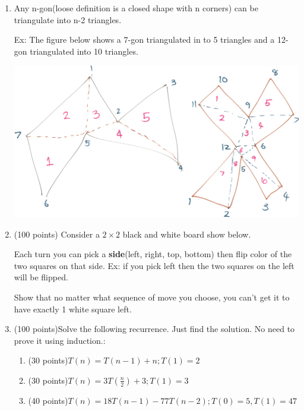 \documentclass[a4paper, 12pt, addpoints]{exam}
\newcommand{\manswer}{\vspace{2.5in}}
\begin{document}
\begin{enumerate}
	\newpage
	\item Any n-gon(loose definition is a closed shape with n corners) can be triangulate into n-2 triangles.
	
	Ex: The figure below shows a 7-gon triangulated in to 5 triangles and a 12-gon triangulated into 10 triangles.
	
	\begin{center}
		\includegraphics[width=0.7\linewidth]{n-gon}
	\end{center}
	
	
	
	

	
		
	\newpage
	\item (100 points)
	Consider a $2 \times 2$ black and white board show below.
	
	\begin{center}
	\end{center}
	
	Each turn you can pick a \textbf{side}(left, right, top, bottom) then flip color of the two squares on that side. Ex: if you pick left then the two squares on the left will be flipped.
	
	Show that no matter what sequence of move you choose, you can't get it to have exactly 1 white square left.
	
	\newpage
	\item (100 points)Solve the following recurrence. Just find the solution. No need to prove it using induction.:
	\begin{enumerate}
		\item (30 points)$T(n) = T(n-1) + n; T(1)=2$
		\vspace{4in}
		\item (30 points)$\displaystyle T(n)= 3T\left(\frac{n}{2}\right) + 3; T(1) = 3$
		\manswer
		\newpage
		\item (40 points)$T(n) = 18 T(n-1) - 77 T(n-2); T(0)=5, T(1)=47$
	\end{enumerate}

\end{enumerate}
\end{document}
